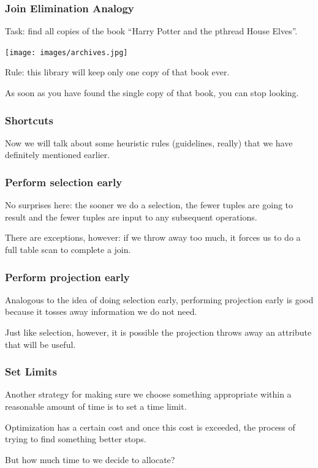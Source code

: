 \begin{frame}
\frametitle{Join Elimination Analogy}
Task: find all copies of the book ``Harry Potter and the pthread House Elves''. 


\begin{center}
	\texttt{[image: images/archives.jpg]}
\end{center}

Rule: this library will keep only one copy of that book ever. 

As soon as you have found the single copy of that book, you can stop looking.

\end{frame}

\begin{frame}
\frametitle{Shortcuts}

Now we will talk about some heuristic rules (guidelines, really) that we have definitely mentioned earlier.


\end{frame}

\begin{frame}
\frametitle{Perform selection early}

No surprises here: the sooner we do a selection, the fewer tuples are going to result and the fewer tuples are input to any subsequent operations. 


There are exceptions, however: if we throw away too much, it forces us to do a full table scan to complete a join. 


\end{frame}

\begin{frame}
\frametitle{Perform projection early}

Analogous to the idea of doing selection early, performing projection early is good because it tosses away information we do not need.

Just like selection, however, it is possible the projection throws away an attribute that will be useful.


\end{frame}

\begin{frame}
\frametitle{Set Limits}

Another strategy for making sure we choose something appropriate within a reasonable amount of time is to set a time limit. 

Optimization has a certain cost and once this cost is exceeded, the process of trying to find something better stops. 

But how much time to we decide to allocate? 


\end{frame}

